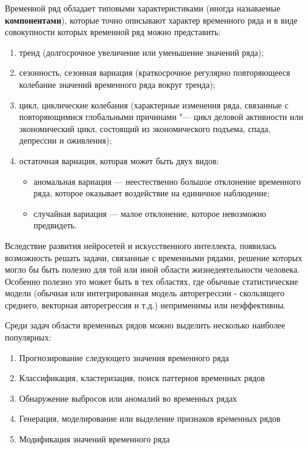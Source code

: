 \documentclass[bachelor, och, referat]{../shiza}
\begin{document}
    Временной ряд обладает типовыми характеристиками (иногда называемые
    \textbf{компонентами}), которые точно описывают характер временного ряда и в
    виде совокупности которых временной ряд можно представить:
    
    \begin{enumerate}
        \item тренд (долгосрочное увеличение или уменьшение значений ряда);
        \item сезонность, сезонная вариация (краткосрочное регулярно
        повторяющееся колебание значений временного ряда вокруг тренда);
        \item цикл, циклические колебания (характерные изменения ряда, связанные
        с повторяющимися глобальными причинами "--- цикл деловой активности или
        экономический цикл, состоящий из экономического подъема, спада,
        депрессии и оживления);
        \item остаточная вариация, которая может быть двух видов:
            \begin{itemize}
                \item аномальная вариация — неестественно большое отклонение
                временного ряда, которое оказывает воздействие на единичное
                наблюдение;
                \item случайная вариация — малое отклонение, которое невозможно
                предвидеть.
            \end{itemize}
    \end{enumerate}


    Вследствие развития нейросетей и искусственного интеллекта, появилась
    возможность решать задачи, связанные с временными рядами, решение которых
    могло бы быть полезно для той или иной области жизнедеятельности человека.
    Особенно полезно это может быть в тех областях, где обычные статистические
    модели (обычная или интегрированная модель авторегрессии - скользящего
    среднего, векторная авторегрессия и т.д.) неприменимы или неэффективны.

    Среди задач области временных рядов можно выделить несколько наиболее
    популярных:

    \begin{enumerate}
        \item Прогнозирование следующего значения временного ряда
        \item Классификация, кластеризация, поиск паттернов временных рядов
        \item Обнаружение выбросов или аномалий во временных рядах
        \item Генерация, моделирование или выделение признаков временных рядов
        \item Модификация значений временного ряда
    \end{enumerate}
\end{document}
